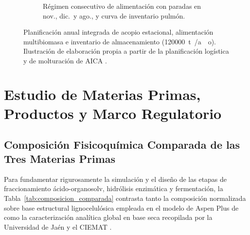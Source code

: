 \documentclass{report}
\begin{document}
\begin{figure}[H]
\begin{subfigure}[b]{0.96\textwidth}
        \caption{Régimen consecutivo de alimentación con paradas en nov., dic.\ y ago., y curva de inventario pulmón.}
    \end{subfigure}
    \caption{Planificación anual integrada de acopio estacional, alimentación multibiomasa e inventario de almacenamiento (\SI{120000}{\tonne{}/ao}). Ilustración de elaboración propia a partir de la planificación logística y de molturación de AICA \autocite{AICA2026}.}
    \label{fig:calendario_estacional}
\end{figure}

\chapter{Estudio de Materias Primas, Productos y Marco Regulatorio}

\section{Composición Fisicoquímica Comparada de las Tres Materias Primas}
Para fundamentar rigurosamente la simulación y el diseño de las etapas de fraccionamiento ácido-organosolv, hidrólisis enzimática y fermentación, la Tabla~\ref{tab:composicion_comparada} contrasta tanto la composición normalizada sobre base estructural lignocelulósica empleada en el modelo de Aspen Plus de \textcite[Tabla~2]{Jafari-Gohargan2026} como la caracterización analítica global en base seca recopilada por la Universidad de Jaén \autocite[Tabla~1]{MoranAlarcon2026} y el CIEMAT \autocite[Sección~2.1]{RomeroGarcia2022}.
\end{document}
